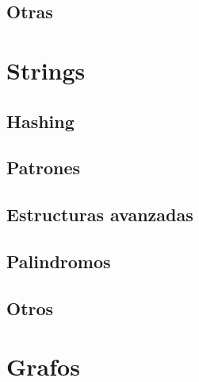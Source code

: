 \documentclass[twocolumn]{article}
\begin{document}
%	

	\subsection{Otras}
	
	

	\section{Strings}
	\subsection{Hashing}
	

	\subsection{Patrones}
	
	
	
	
	

	\subsection{Estructuras avanzadas}
	
	
	

	\subsection{Palindromos}
	

	\subsection{Otros}
	

	\section{Grafos}
\end{document}
